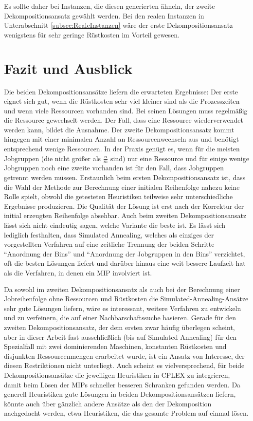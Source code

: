 \documentclass{scrreprt}
\begin{document}
Es sollte daher bei Instanzen, die diesen generierten ähneln, der zweite Dekompositionsansatz gewählt werden.
Bei den realen Instanzen in Unterabschnitt \ref{subsec:RealeInstanzen} wäre der erste Dekompositionsansatz wenigstens für sehr 
geringe Rüstkosten im Vorteil gewesen.

\chapter{Fazit und Ausblick}
Die beiden Dekompositionsansätze liefern die erwarteten Ergebnisse:
Der erste eignet sich gut, wenn die Rüstkosten sehr viel kleiner sind als die Prozesszeiten und wenn viele Ressourcen vorhanden sind.
Bei seinen Lösungen muss regelmäßig die Ressource gewechselt werden.
Der Fall, dass eine Ressource wiederverwendet werden kann, bildet die Ausnahme.
Der zweite Dekompositionsansatz kommt hingegen mit einer minimalen Anzahl an Ressourcenwechseln aus und benötigt entsprechend wenige Ressourcen.
In der Praxis genügt es, wenn für die meisten Jobgruppen (die nicht größer als $\frac{n}{m}$ sind) nur eine Ressource 
und für einige wenige Jobgruppen noch eine zweite vorhanden ist für den Fall, dass Jobgruppen getrennt werden müssen.
Erstaunlich beim ersten Dekompositionsansatz ist, dass die Wahl der Methode zur Berechnung einer initialen Reihenfolge nahezu keine Rolle spielt,
obwohl die getesteten Heuristiken teilweise sehr unterschiedliche Ergebnisse produzieren.
Die Qualität der Lösung ist erst nach der Korrektur der initial erzeugten Reihenfolge absehbar.
Auch beim zweiten Dekompositionsansatz lässt sich nicht eindeutig sagen, welche Variante die beste ist.
Es lässt sich lediglich festhalten, dass Simulated Annealing, welches als einziges der vorgestellten Verfahren auf eine zeitliche Trennung der beiden Schritte
"`Anordnung der Bins"' und "`Anordnung der Jobgruppen in den Bins"' verzichtet, oft die besten Lösungen liefert und darüber hinaus eine weit bessere Laufzeit hat als die
Verfahren, in denen ein MIP involviert ist.

Da sowohl im zweiten Dekompositionsansatz als auch bei der Berechnung einer Jobreihenfolge ohne Ressourcen und Rüstkosten
die Simulated-Annealing-Ansätze sehr gute Lösungen liefern, wäre es interessant, 
weitere Verfahren zu entwickeln und zu verfeinern, die auf einer Nachbarschaftssuche basieren.
Gerade für den zweiten Dekompositionsansatz, der dem ersten zwar häufig überlegen scheint, 
aber in dieser Arbeit fast ausschließlich (bis auf Simulated Annealing) für den Spezialfall mit zwei dominierenden Maschinen, 
konstanten Rüstkosten und disjunkten Ressourcenmengen erarbeitet wurde,
ist ein Ansatz von Interesse, der diesen Restriktionen nicht unterliegt.
Auch scheint es vielversprechend, für beide Dekompositionsansätze die jeweiligen Heuristiken in CPLEX zu integrieren, 
damit beim Lösen der MIPs schneller besseren Schranken gefunden werden.
Da generell Heuristiken gute Lösungen in beiden Dekompositionsansätzen liefern, könnte auch über gänzlich andere Ansätze als den der Dekomposition nachgedacht werden,
etwa Heuristiken, die das gesamte Problem auf einmal lösen.
\end{document}
